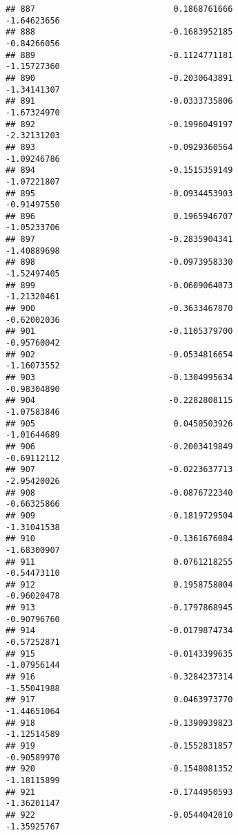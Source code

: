 \documentclass[
]{article}
\begin{document}
\begin{verbatim}
## 887                            0.1868761666                -1.64623656
## 888                           -0.1683952185                -0.84266056
## 889                           -0.1124771181                -1.15727360
## 890                           -0.2030643891                -1.34141307
## 891                           -0.0333735806                -1.67324970
## 892                           -0.1996049197                -2.32131203
## 893                           -0.0929360564                -1.09246786
## 894                           -0.1515359149                -1.07221807
## 895                           -0.0934453903                -0.91497550
## 896                            0.1965946707                -1.05233706
## 897                           -0.2835904341                -1.40889698
## 898                           -0.0973958330                -1.52497405
## 899                           -0.0609064073                -1.21320461
## 900                           -0.3633467870                -0.62002036
## 901                           -0.1105379700                -0.95760042
## 902                           -0.0534816654                -1.16073552
## 903                           -0.1304995634                -0.98304890
## 904                           -0.2282808115                -1.07583846
## 905                            0.0450503926                -1.01644689
## 906                           -0.2003419849                -0.69112112
## 907                           -0.0223637713                -2.95420026
## 908                           -0.0876722340                -0.66325866
## 909                           -0.1819729504                -1.31041538
## 910                           -0.1361676084                -1.68300907
## 911                            0.0761218255                -0.54473110
## 912                            0.1958758004                -0.96020478
## 913                           -0.1797868945                -0.90796760
## 914                           -0.0179874734                -0.57252871
## 915                           -0.0143399635                -1.07956144
## 916                           -0.3284237314                -1.55041988
## 917                            0.0463973770                -1.44651064
## 918                           -0.1390939823                -1.12514589
## 919                           -0.1552831857                -0.90589970
## 920                           -0.1548081352                -1.18115899
## 921                           -0.1744950593                -1.36201147
## 922                           -0.0544042010                -1.35925767

\end{verbatim}
\end{document}
